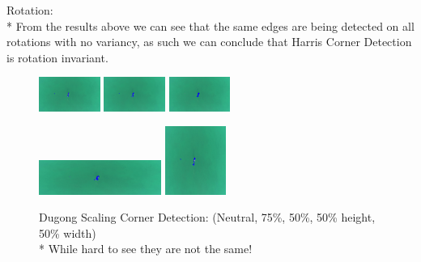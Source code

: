 \documentclass[conference]{IEEEtran}
\begin{document}
Rotation: \\*
From the results above we can see that the same edges are being detected on all rotations with no variancy, as such we can conclude that Harris Corner Detection is rotation invariant.
\begin{figure}[H]
    \centerline{
        {\includegraphics[width=20mm, scale=0.5]{./figures/Harris Corner/DugongNeutral Corners.png}}
        {\includegraphics[width=20mm, scale=0.5]{./figures/Harris Corner/Dugong75 Corners.png}}
        {\includegraphics[width=20mm, scale=0.5]{./figures/Harris Corner/Dugong50 Corners.png}}
    }
    \centerline{
        {\includegraphics[width=40mm, scale=0.5]{./figures/Harris Corner/DugongheightReduced Corners.png}}
        {\includegraphics[width=20mm, scale=0.5]{./figures/Harris Corner/DugongwidthReduced Corners.png}}
    }
    \caption{Dugong Scaling Corner Detection: (Neutral, 75\%, 50\%, 50\% height, 50\% width)\\*
    While hard to see they are not the same!}
    \label{fig}
\end{figure}
\end{document}
